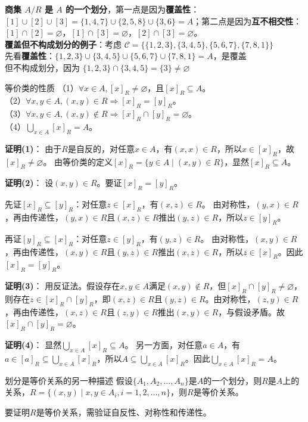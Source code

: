 \textbf{商集 $A/R$ 是 $A$ 的一个划分}，第一点是因为\textbf{覆盖性}：$[1] \cup [2] \cup [3] = \{1,4,7\} \cup \{2,5,8\} \cup \{3,6\} = A$；第二点是因为\textbf{互不相交性}：$[1] \cap [2] = \varnothing$，$[1] \cap [3] = \varnothing$，$[2] \cap [3] = \varnothing$。\\
\textbf{覆盖但不构成划分的例子}：考虑 $\mathcal{C} = \{\{1,2,3\}, \{3,4,5\}, \{5,6,7\}, \{7,8,1\}\}$\\先看\textbf{覆盖性}：$\{1,2,3\} \cup \{3,4,5\} \cup \{5,6,7\} \cup \{7,8,1\} = A$，是覆盖
\\但不构成划分，因为 $\{1,2,3\} \cap \{3,4,5\} = \{3\} \neq \varnothing$
\begin{theorem}{等价类的性质}{}
（1）$\forall x\in A,[x]_R\ne\varnothing$，且$[x]_R\subseteq A$。\\
（2）$\forall x,y\in A,(x,y)\in R\Rightarrow [x]_R=[y]_R$。\\
（3）$\forall x,y\in A,(x,y)\notin R\Rightarrow [x]_R\cap[y]_R=\varnothing$。\\
（4）$\bigcup_{x\in A} [x]_R = A$。
\end{theorem}
\textbf{证明(1)}：
由于$R$是自反的，对任意$x \in A$，有$(x,x) \in R$，所以$x \in [x]_R$，故$[x]_R \neq \varnothing$。
由等价类的定义$[x]_R = \{y \in A \mid (x,y) \in R\}$，显然$[x]_R \subseteq A$。

\textbf{证明(2)}：
设$(x,y) \in R$。要证$[x]_R = [y]_R$。

先证$[x]_R \subseteq [y]_R$：对任意$z \in [x]_R$，有$(x,z) \in R$。
由对称性，$(y,x) \in R$，再由传递性，$(y,x) \in R$且$(x,z) \in R$推出$(y,z) \in R$，所以$z \in [y]_R$。

再证$[y]_R \subseteq [x]_R$：对任意$z \in [y]_R$，有$(y,z) \in R$。
由对称性，$(x,y) \in R$，再由传递性，$(x,y) \in R$且$(y,z) \in R$推出$(x,z) \in R$，所以$z \in [x]_R$。因此$[x]_R = [y]_R$。

\textbf{证明(3)}：
用反证法。假设存在$x,y \in A$满足$(x,y) \notin R$，但$[x]_R \cap [y]_R \neq \varnothing$，
则存在$z \in [x]_R \cap [y]_R$，即$(x,z) \in R$且$(y,z) \in R$。由对称性，$(z,y) \in R$，再由传递性，$(x,z) \in R$且$(z,y) \in R$推出$(x,y) \in R$，与假设矛盾。故$[x]_R \cap [y]_R = \varnothing$。

\textbf{证明(4)}：
显然$\bigcup_{x\in A} [x]_R \subseteq A$。
另一方面，对任意$a \in A$，有$a \in [a]_R \subseteq \bigcup_{x\in A} [x]_R$，所以$A \subseteq \bigcup_{x\in A} [x]_R$。因此$\bigcup_{x\in A} [x]_R = A$。
\begin{theorem}{划分是等价关系的另一种描述}{}
    假设$\{A_1, A_2, \ldots, A_n\}$是$A$的一个划分，则$R$是$A$上的关系，$R=\{(x,y) \mid x,y\in A_i,i=1,2,\ldots,n\}$，则$R$是等价关系。
\end{theorem}
要证明$R$是等价关系，需验证自反性、对称性和传递性。

